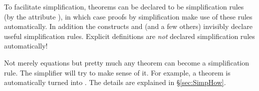 %
\begin{isabellebody}%
\def\isabellecontext{simp}%
%
%
\begin{isamarkuptext}%
To facilitate simplification, theorems can be declared to be simplification
rules (by the attribute ), in which case proofs by simplification make use of these
rules automatically. In addition the constructs  and
 (and a few others) invisibly declare useful
simplification rules. Explicit definitions are \emph{not} declared
simplification rules automatically!

Not merely equations but pretty much any theorem can become a simplification
rule. The simplifier will try to make sense of it.  For example, a theorem
 is automatically turned into . The details
are explained in \S\ref{sec:SimpHow}.


\end{isamarkuptext}
\end{isabellebody}

